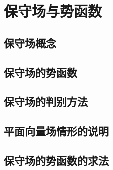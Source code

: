 \section{保守场与势函数}
\subsection{保守场概念}
\subsection{保守场的势函数}
\subsection{保守场的判别方法}
\subsection{平面向量场情形的说明}
\subsection{保守场的势函数的求法}
\begin{exercise}
\item
\end{exercise}
\begin{exercise*}
\item
\end{exercise*}


\endinput
